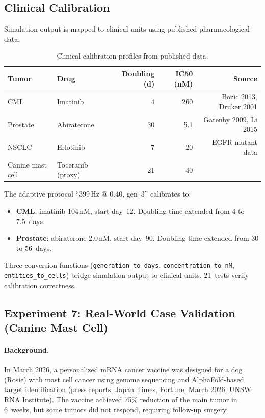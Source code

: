 \documentclass[11pt,a4paper]{article}
\begin{document}
\subsection{Clinical Calibration}

Simulation output is mapped to clinical units using
published pharmacological data:

\begin{table}[h]
\centering
\caption{Clinical calibration profiles from published data.}
\label{tab:calibration}
\small
\begin{tabular}{@{}llrrr@{}}
\toprule
\textbf{Tumor} & \textbf{Drug} & \textbf{Doubling (d)} & \textbf{IC50 (nM)} & \textbf{Source} \\
\midrule
CML & Imatinib & 4 & 260 & Bozic 2013, Druker 2001 \\
Prostate & Abiraterone & 30 & 5.1 & Gatenby 2009, Li 2015 \\
NSCLC & Erlotinib & 7 & 20 & EGFR mutant data \\
Canine mast cell & Toceranib (proxy) & 21 & 40 & \citet{london2003mast,london2009toceranib} \\
\bottomrule
\end{tabular}
\end{table}

The adaptive protocol ``399\,Hz @ 0.40, gen~3'' calibrates to:
\begin{itemize}
  \item \textbf{CML}: imatinib 104\,nM, start day~12.
        Doubling time extended from 4 to 7.5~days.
  \item \textbf{Prostate}: abiraterone 2.0\,nM, start day~90.
        Doubling time extended from 30 to 56~days.
\end{itemize}

Three conversion functions (\texttt{generation\_to\_days},
\texttt{concentration\_to\_nM}, \texttt{entities\_to\_cells})
bridge simulation output to clinical units.
21~tests verify calibration correctness.

\subsection{Experiment 7: Real-World Case Validation (Canine Mast Cell)}

\paragraph{Background.}
In March 2026, a personalized mRNA cancer vaccine was designed for
a dog (Rosie) with mast cell cancer using genome sequencing and
AlphaFold-based target identification (press reports: Japan Times,
Fortune, March 2026; UNSW RNA Institute).
The vaccine achieved 75\% reduction of the main tumor in 6~weeks,
but some tumors did not respond, requiring follow-up surgery.
\end{document}

